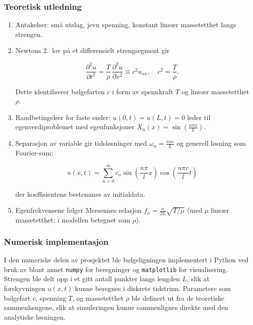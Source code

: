\subsubsection{Teoretisk utledning}
\begin{enumerate}
  \item Antakelser: små utslag, jevn spenning, konstant lineær massetetthet langs strengen. 
  \item Newtons 2.~lov på et differensielt strengsegment gir
  
  \begin{equation*}
    \frac{\partial^2 u}{\partial t^2} = \frac{T}{\rho}\,\frac{\partial^2 u}{\partial x^2} \equiv c^2 u_{xx},\quad c^2=\frac{T}{\rho}.
  \end{equation*}

  Dette identifiserer bølgefarten $c$ i form av spennkraft $T$ og lineær massetetthet $\rho$.
  \item Randbetingelser for faste ender: $u(0,t)=u(L,t)=0$ leder til egenverdiproblemet med egenfunksjoner $X_n(x)=\sin\!\left(\frac{n\pi x}{L}\right)$. 
  \item Separasjon av variable gir tidsløsninger med $\omega_n=\frac{n\pi c}{L}$ og generell løsning som Fourier-sum:
  
  \begin{equation*}
	u(x,t) = \sum_{n=0}^{\infty} c_n 
	\sin \left( \frac{n \pi}{l} x \right)
	\cos \left( \frac{n \pi c}{l} t \right)
  \end{equation*}

  der koeffisientene bestemmes av initialdata.
  \item Egenfrekvensene følger Mersennes relasjon $f_n=\frac{n}{2L}\sqrt{T/\mu}$ (med $\mu$ lineær massetetthet; i modellen betegnet som $\rho$). 
\end{enumerate}

\subsubsection{Numerisk implementasjon}

I den numeriske delen av prosjektet ble bølgeligningen implementert i Python ved bruk av blant annet \texttt{numpy} for beregninger og \texttt{matplotlib} for visualisering. 
Strengen ble delt opp i et gitt antall punkter langs lengden $L$, slik at forskyvningen $u(x,t)$ kunne beregnes i diskrete tidstrinn. 
Parametere som bølgefart $c$, spenning $T$, og massetetthet $\rho$ ble definert ut fra de teoretiske sammenhengene, slik at simuleringen kunne sammenlignes direkte med den analytiske løsningen. 


